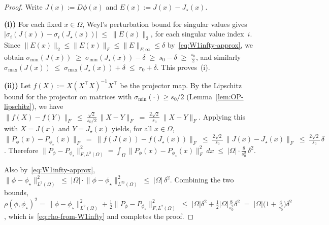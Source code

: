 \documentclass[11pt]{article}
\newcommand{\Om}{\Omega}
\newcommand{\norm}[1]{\lVert#1\rVert}
\newcommand{\abs}[1]{|#1|}
\newcommand{\sigmin}{\sigma_{\min}}
\newcommand{\sigmax}{\sigma_{\max}}
\begin{document}
\begin{proof}
Write $J(x):=D\phi(x)$ and $E(x):=J(x)-J_\star(x)$.

\noindent \textbf{(i))}
For each fixed $x\in \Om$, Weyl's perturbation bound for singular
values gives
$\abs{\sigma_i(J(x))-\sigma_i(J_\star(x))}
  \;\le\; \norm{E(x)}_2$,
for each singular value index~$i$.  Since
$\norm{E(x)}_2\le \norm{E(x)}_F
 \le \norm{E}_{F,\infty}\le \delta$
by~\eqref{eq:W1infty-approx}, we obtain
$\sigmin(J(x))
  \;\ge\; \sigmin(J_\star(x))-\delta
  \;\ge\; s_0-\delta
  \;\ge\; \frac{s_0}{2}$,
and similarly
$\sigmax(J(x))
  \;\le\; \sigmax(J_\star(x))+\delta
  \;\le\; r_0+\delta$. 
This proves~(i).

\noindent \textbf{(ii))}
Let $f(X):=X(X^\top X)^{-1}X^\top$ be the projector map.  By the
Lipschitz bound for the projector on matrices with
$\sigmin(\cdot)\ge s_0/2$ (Lemma~\ref{lem:OP-lipschitz}), we have
 $ \norm{f(X)-f(Y)}_F
  \;\le\;
  \frac{\sqrt{2}}{s_0/2}\,\norm{X-Y}_F
  \;=\;
  \frac{2\sqrt{2}}{s_0}\,\norm{X-Y}_F$.
Applying this with $X=J(x)$ and $Y=J_\star(x)$ yields, for all
$x\in \Om$,
  $\norm{P_\phi(x)-P_{\phi_\star}(x)}_F
  \;=\;\norm{f(J(x))-f(J_\star(x))}_F
  \;\le\;\frac{2\sqrt{2}}{s_0}\,\norm{J(x)-J_\star(x)}_F
  \;\le\;\frac{2\sqrt{2}}{s_0}\,\delta$.
Therefore
  $\norm{P_\phi-P_{\phi_\star}}_{F,L^2(\Om)}^2
  =\int_\Om \norm{P_\phi(x)-P_{\phi_\star}(x)}_F^2\,dx
  \;\le\;
  \abs{\Om}\cdot \frac{8}{s_0^2}\,\delta^2$.


Also by~\eqref{eq:W1infty-approx},
  $\norm{\phi-\phi_\star}_{L^2(\Om)}^2
  \;\le\;
  \abs{\Om}\cdot \norm{\phi-\phi_\star}_{L^\infty(\Om)}^2
  \;\le\;
  \abs{\Om}\,\delta^2$.
Combining the two bounds,
  $\rho(\phi,\phi_\star)^2
  =\norm{\phi-\phi_\star}_{L^2(\Om)}^2
   +\tfrac12\norm{P_\phi-P_{\phi_\star}}_{F,L^2(\Om)}^2
  \;\le\;
  \abs{\Om}\delta^2
+\tfrac12\abs{\Om}\frac{8}{s_0^2}\delta^2
  \;=\;
  \abs{\Om}\Big(1+\frac{4}{s_0^2}\Big)\delta^2$,
which is~\eqref{eq:rho-from-W1infty} and completes the proof.
\end{proof}
\end{document}
